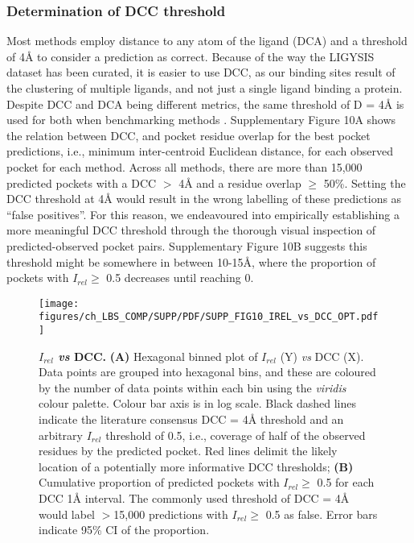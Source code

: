 \subsubsection{Determination of DCC threshold}

Most methods employ distance to any atom of the ligand (DCA) and a threshold of 4\AA{} to consider a prediction as correct. Because of the way the LIGYSIS dataset has been curated, it is easier to use DCC, as our binding sites result of the clustering of multiple ligands, and not just a single ligand binding a protein. Despite DCC and DCA being different metrics, the same threshold of D = 4\AA{} is used for both when benchmarking methods \cite{AGGARWAL_2022_DEEPPOCKET, SESTAK_2024_VNEGNN, KANDEL_2021_PURESNET}. Supplementary Figure 10A shows the relation between DCC, and pocket residue overlap for the best pocket predictions, i.e., minimum inter-centroid Euclidean distance, for each observed pocket for each method. Across all methods, there are more than 15,000 predicted pockets with a DCC $>$ 4\AA{} and a residue overlap $\geq$ 50\%. Setting the DCC threshold at 4\AA{} would result in the wrong labelling of these predictions as ``false positives''. For this reason, we endeavoured into empirically establishing a more meaningful DCC threshold through the thorough visual inspection of predicted-observed pocket pairs. Supplementary Figure 10B suggests this threshold might be somewhere in between 10-15\AA{}, where the proportion of pockets with $I_{rel} \geq$ 0.5 decreases until reaching 0.

\begin{figure}[ht!]
    \centering
    \texttt{[image: figures/ch\_LBS\_COMP/SUPP/PDF/SUPP\_FIG10\_IREL\_vs\_DCC\_OPT.pdf]}
    \caption[$I_{rel}$ \textit{vs} DCC]{\textbf{$I_{rel}$ \textit{vs} DCC.} \textbf{(A)} Hexagonal binned plot of $I_{rel}$ (Y) \textit{vs} DCC (X). Data points are grouped into hexagonal bins, and these are coloured by the number of data points within each bin using the \textit{viridis} colour palette. Colour bar axis is in log scale. Black dashed lines indicate the literature consensus DCC = 4\AA{} threshold and an arbitrary $I_{rel}$ threshold of 0.5, i.e., coverage of half of the observed residues by the predicted pocket.  Red lines delimit the likely location of a potentially more informative DCC thresholds; \textbf{(B)} Cumulative proportion of predicted pockets with $I_{rel} \geq$ 0.5 for each DCC 1\AA{} interval. The commonly used threshold of DCC = 4\AA{} would label $>$15,000 predictions with $I_{rel} \geq$ 0.5 as false. Error bars indicate 95\% CI of the proportion.}
    \label{fig:irel_vs_dcc}
\end{figure}

